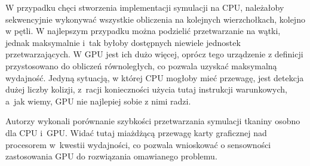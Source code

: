 		W przypadku chęci stworzenia implementacji symulacji na CPU, należałoby sekwencyjnie wykonywać wszystkie obliczenia na kolejnych wierzchołkach, kolejno w pętli. W najlepszym przypadku można podzielić przetwarzanie na wątki, jednak maksymalnie i~tak byłoby dostępnych niewiele jednostek przetwarzających. W GPU jest ich dużo więcej, oprócz tego urządzenie z definicji przystosowano do obliczeń równoległych, co pozwala uzyskać maksymalną wydajność. Jedyną sytuacją, w której CPU mogłoby mieć przewagę, jest detekcja dużej liczby kolizji, z~racji konieczności użycia tutaj instrukcji warunkowych, a~jak wiemy, GPU nie najlepiej sobie z nimi radzi.
		
		
		Autorzy \cite{deformable} wykonali porównanie szybkości przetwarzania symulacji tkaniny osobno dla CPU i~GPU. Widać tutaj miażdżącą przewagę karty graficznej nad procesorem w~kwestii wydajności, co pozwala wnioskować o sensowności zastosowania GPU do rozwiązania omawianego problemu.
